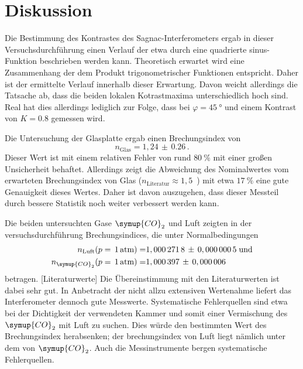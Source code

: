 \section{Diskussion}
\label{sec:diskussion}

Die Bestimmung des Kontrastes des Sagnac-Interferometers ergab in
dieser Versuchsdurchführung einen Verlauf der etwa durch eine
quadrierte sinus-Funktion beschrieben werden kann. Theoretisch
erwartet wird eine Zusammenhang der dem Produkt trigonometrischer
Funktionen entspricht. Daher ist der ermittelte Verlauf innerhalb
dieser Erwartung. Davon weicht allerdings die Tatsache ab, dass die
beiden lokalen Kotrastmaxima unterschiedlich hoch sind. Real hat dies
allerdings lediglich zur Folge, dass bei $\varphi=\SI{45}{\degree}$
und einem Kontrast von $K=0.8$ gemessen wird.

Die Untersuchung der Glasplatte ergab einen Brechungsindex von
%
\begin{equation*}
  n_\text{Glas}=1,24\,\pm\,0.26 \, .
\end{equation*}
%
Dieser Wert ist mit einem relativen Fehler von rund
$\SI{80}{\percent}$ mit einer großen Unsicherheit behaftet.
Allerdings zeigt die Abweichung des Nominalwertes vom erwarteten
Brechungsindex von Glas ($n_\text{Literatur}\approx
1,5$~\cite{??}) mit etwa $\SI{17}{\percent}$ eine gute Genauigkeit
dieses Wertes. Daher ist davon auszugehen, dass dieser Messteil durch
bessere Statistik noch weiter verbessert werden kann.

Die beiden untersuchten Gase $\symup{CO}_2$ und Luft zeigten in der versuchsdurchführung Brechungsindices, die unter Normalbedingungen
%
\begin{align*}
  n_\text{Luft}(p=\,1\,\text{atm})=& 1,000\,271\,8\,\pm\,0,000\,000\,5   \;\text{und} \\
  n_{\symup{CO}_2}(p=\,1\,\text{atm})=& 1,000\,397\,\pm\,0,000\,006
\end{align*}
%
betragen. [Literaturwerte]
Die Übereinstimmung mit den Literaturwerten ist dabei sehr gut. In Anbetracht der nicht allzu extensiven Wertenahme liefert das Interferometer dennoch gute Messwerte. Systematische Fehlerquellen sind etwa bei der Dichtigkeit der verwendeten Kammer und somit einer Vermischung des $\symup{CO}_2$ mit Luft zu suchen. Dies würde den bestimmten Wert des Brechungsindex herabsenken; der brechungsindex von Luft liegt nämlich unter dem von $\symup{CO}_2$. Auch die Messinstrumente bergen systematische Fehlerquellen.
